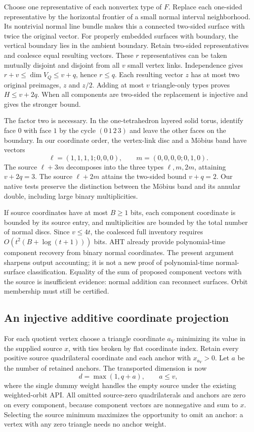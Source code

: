 Choose one representative of each nonvertex type of $F$. Replace each
one-sided representative by the horizontal frontier of a small normal
interval neighborhood. Its nontrivial normal line bundle makes this a
connected two-sided surface with twice the original vector. For properly
embedded surfaces with boundary, the vertical boundary lies in the ambient
boundary. Retain two-sided representatives and coalesce equal resulting
vectors. These $r$ representatives can be taken mutually disjoint and
disjoint from all $v$ small vertex links. Independence gives
$r+v\le\dim V_Q\le v+q$, hence $r\le q$. Each resulting vector $z$ has at
most two original preimages, $z$ and $z/2$. Adding at most $v$ triangle-only
types proves $H\le v+2q$. When all components are two-sided the replacement
is injective and gives the stronger bound.

The factor two is necessary. In the one-tetrahedron layered solid torus,
identify face $0$ with face $1$ by the cycle $(0\,1\,2\,3)$ and leave the
other faces on the boundary. In our coordinate order, the vertex-link disc
and a M\"obius band have vectors
\[
 \ell=(1,1,1,1;0,0,0),\qquad m=(0,0,0,0;0,1,0).
\]
The source $\ell+3m$ decomposes into the three types $\ell,m,2m$, attaining
$v+2q=3$. The source $\ell+2m$ attains the two-sided bound $v+q=2$.
Our native tests preserve the distinction between the M\"obius band and its
annular double, including large binary multiplicities.

If source coordinates have at most $B\ge1$ bits, each component coordinate
is bounded by its source entry, and multiplicities are bounded by the total
number of normal discs. Since $v\le4t$, the coalesced full inventory requires
$O(t^2(B+\log(t+1)))$ bits. AHT already provide polynomial-time component
recovery from binary normal coordinates\cite[Corollary 17]{aht-orbits}.
The present argument sharpens output accounting; it is not a new proof of
polynomial-time normal-surface classification. Equality of the sum of
proposed component vectors with the source is insufficient evidence:
normal addition can reconnect surfaces. Orbit membership must still be
certified.

\subsection{An injective additive coordinate projection}

For each quotient vertex choose a triangle coordinate $a_V$ minimizing its
value in the supplied source $x$, with ties broken by flat coordinate index.
Retain every positive source quadrilateral coordinate and each anchor with
$x_{a_V}>0$. Let $a$ be the number of retained anchors. The transported
dimension is now
\[
 d=\max(1,q+a),\qquad a\le v,
\]
where the single dummy weight handles the empty source under the existing
weighted-orbit API. All omitted source-zero quadrilaterals and anchors are
zero on every component, because component vectors are nonnegative and sum
to $x$. Selecting the source minimum maximizes the opportunity to omit an
anchor: a vertex with any zero triangle needs no anchor weight.

